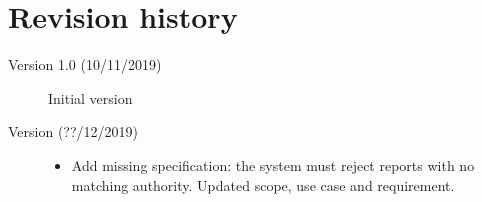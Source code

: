 \section{Revision history}
\begin{description}
    \item[Version 1.0 (10/11/2019)] Initial version
    \item[Version \Version{} (??/12/2019)]
    \begin{itemize}
        \item Add missing specification: the system must reject reports with no
        matching authority. Updated scope, use case and requirement.
    \end{itemize}  
\end{description}